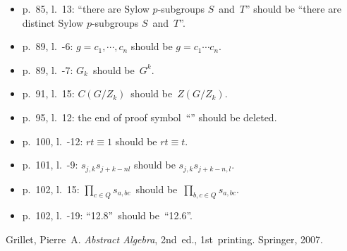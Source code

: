\documentclass[letterpaper,12pt]{article}
\begin{document}
\begin{itemize}
\item p.~85, l.~13: ``there are Sylow \(p\)-subgroups \(S\)~and~\(T\)'' should be ``there are distinct Sylow \(p\)-subgroups \(S\)~and~\(T\)''.
\item p.~89, l.~-6: \(g=c_1,\cdots,c_n\) should be \(g=c_1\cdots c_n\).
\item p.~89, l.~-7: \(G_k\)~should be~\(G^k\).
\item p.~91, l.~15: \(C(G/Z_k)\)~should be~\(Z(G/Z_k)\).
\item p.~95, l.~12: the end of proof symbol~``\qedsymbol'' should be deleted.
\item p.~100, l.~-12: \(rt\equiv 1\) should be \(rt\equiv t\).
\item p.~101, l.~-9: \(s_{j,k}s_{j+k-nl}\) should be \(s_{j,k}s_{j+k-n,l}\).
\item p.~102, l.~15: \(\prod_{c\in Q}s_{a,bc}\)~should be~\(\prod_{b,c\in Q}s_{a,bc}\).
\item p.~102, l.~-19: ``12.8''~should be~``12.6''.
\end{itemize}

\begin{thebibliography}{0}
 Grillet, Pierre~A. \textit{Abstract Algebra}, 2nd~ed., 1st~printing. Springer, 2007.
\end{thebibliography}
\end{document}
